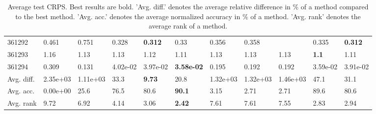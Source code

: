 \begin{table}[ht!]
\begin{tabular}{lllllllllll}
  361292 & 0.461 & 0.751 & 0.328 & \textbf{0.312} & 0.33 & 0.356 & 0.358 &  & 0.335 & \textbf{0.312} \\ 
  361293 & 1.16 & 1.13 & 1.13 & 1.12 & 1.11 & 1.13 & 1.13 & 1.13 & \textbf{1.1} & 1.11 \\ 
  361294 & 0.309 & 0.131 & 4.02e-02 & 3.97e-02 & \textbf{3.58e-02} & 0.195 & 0.192 & 0.192 & 3.59e-02 & 3.91e-02 \\ 
   \hline
Avg. diff. & 2.35e+03 & 1.11e+03 & 33.3 & \textbf{9.73} & 20.8 & 1.32e+03 & 1.32e+03 & 1.46e+03 & 47.1 & 31.1 \\ 
  Avg. acc. & 0.00e+00 & 25.6 & 76.5 & 80.6 & \textbf{90.1} & 3.15 & 2.71 & 2.71 & 89.6 & 80.6 \\ 
  Avg. rank & 9.72 & 6.92 & 4.14 & 3.06 & \textbf{2.42} & 7.61 & 7.61 & 7.55 & 2.83 & 2.94 \\ 
   \hline
\hline
\end{tabular}
\endgroup
\caption{Average test CRPS. 
                  Best results are bold. 
                  'Avg. diff.' denotes the average relative difference in \% of a method compared to the best method.
                  'Avg. acc.' denotes the average normalized accuracy in \% of a method.
                  'Avg. rank' denotes the average rank of a method.} 
\label{TABLES/table_results_CRPS_random_splits}
\end{table}
